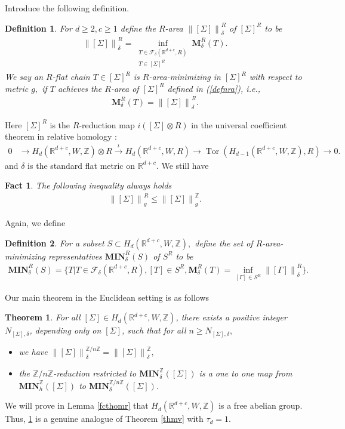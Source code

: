 \documentclass[11pt,a4paper]{amsart}
\numberwithin{equation}{section}
\newcommand{\mn}{\mathbf{MIN}}
\newcommand{\de}{\delta}
\newcommand{\Si}{\Sigma}
\newcommand{\ms}{\mathbf{M}}
\newcommand{\s}{\subset}
\newcommand{\no}[1]{\left\lVert#1\right\rVert}
\newcommand{\ts}{\otimes}
\newcommand{\R}{\mathbb{R}}
\newcommand{\Z}{\mathbb{Z}}
\theoremstyle{plain}
\newtheorem{thm}{Theorem}
\newtheorem{fact}{Fact}[subsection]
\newtheorem{defn}{Definition}[subsection]
\theoremstyle{definition}
\numberwithin{equation}{subsection}
\begin{document}
Introduce the following definition.
	\begin{defn}\label{defnrareab}
	For $d\ge 2,c\ge1$ define the $R$-area $\no{[\Si]}^R_\de$ of $[\Si]^R$ to be
	\begin{align}\label{defnrab}
		\no{[\Si]}^R_\de=\inf_{\substack{T\in\mathcal{F}_\de(\R^{d+c},R)\\ T\in[\Si]^R}}\ms_\de^R(T).
	\end{align}
	We say an $R$-flat chain $T\in[\Si]^R$ is $R$-area-minimizing in $[\Si]^R$ with respect to metric $g,$ if $T$ achieves the $R$-area of $[\Si]^R$ defined in (\ref{defnra}), i.e.,
	\begin{align*}
		\ms^R_\de(T)=\no{[\Si]}^R_\de.
	\end{align*} 
\end{defn} 
Here $[\Si]^R$ is the $R$-reduction map $i([\Si]\ts R)$ in the universal coefficient theorem in relative homology \cite[Corollary 3A.4]{AH}:
\begin{align}
	0&\rightarrow H_d(\R^{d+c},W,\Z)\ts R\overset{\iota}{\rightarrow} H_d(\R^{d+c},W,R)\rightarrow\operatorname{Tor}(H_{d-1}(\R^{d+c},W,\Z),R)\to 0.
\end{align}  and $\de$ is the standard flat metric on $\R^{d+c}$. We still have \begin{fact}\label{fctncmpb}The following inequality always holds
\begin{align}\label{eqinnorm}
	\no{[\Si]}^R_g\le \no{[\Si]}^{\Z}_g.
\end{align}\end{fact}
Again, we define
	\begin{defn}\label{defnpf}
	For a subset $S\s H_d(\R^{d+c},W,\Z),$		define the set of $R$-area-minimizing representatives $\mn_\de^R\left(S\right)$ of $S^R$ to be
	\begin{align*}
		\mn_\de^R\left(S\right)=\{T|T\in \mathcal{F}_\de(\R^{d+c},R),[T]\in S^R,\ms^R_\de(T)=\inf_{[\Gamma]\in S^R}\no{[\Gamma]}^R_\de\}.
	\end{align*} 
\end{defn}Our main theorem in the Euclidean setting is as follows
\begin{thm}\label{thmvb}
	For all $[\Si]\in H_d(\R^{d+c},W,\Z)$, there exists a positive integer $N_{[\Si],\de}$, depending only on $[\Si]$, such that for all $n\ge N_{[\Si],\de},$
	\begin{itemize}
		\item we have $			\no{[\Si]}_\de^{\Z/n\Z}=\no{[\Si]}_\de^\Z,$
		\item the $\Z/n\Z$-reduction restricted to $\mn_\de^{\Z}\left([\Si]\right)$ is a one to one map from  		$\mn_h^{\Z}\left([\Si]\right)$ to $\mn_\de^{\Z/n\Z}\left([\Si]\right)$.	
	\end{itemize} 
\end{thm}
We will prove in Lemma \ref{fcthomr}  that $H_d(\R^{d+c},W,\Z)$ is a free abelian group. Thus, \ref{thmvb} is a genuine analogue of Theorem \ref{thmv} with $\tau_d=1.$
\end{document}
